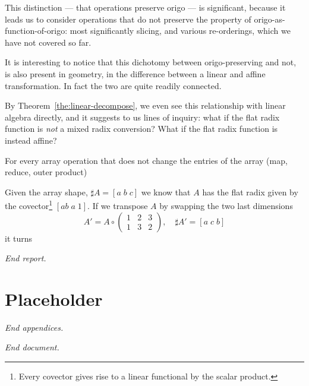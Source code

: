 \documentclass{DIKU-report-variant}
\begin{document}
This distinction --- that operations preserve origo --- is significant, because it leads us to
consider operations that do not preserve the property of origo-as-function-of-origo: most significantly
slicing, and various re-orderings, which we have not covered so far.

It is interesting to notice that this dichotomy between origo-preserving and not, is also present
in geometry, in the difference between a linear and affine transformation. In fact the two
are quite readily connected.

By Theorem~\ref{the:linear-decompose}, we even see this relationship with linear algebra directly,
and it suggests to us lines of inquiry: what if the flat radix function is \emph{not} a mixed radix
conversion? What if the flat radix function is instead affine?

For every array operation that does not change the entries of the array (map, reduce, outer product)

Given the array shape, \(\sharp A = [a\; b\; c]\) we know that \(A\) has the flat radix given
by the covector\footnote{Every covector gives rise to a linear functional by the scalar product.} \([ab\; a\; 1]\).
If we transpose \(A\) by swapping the two last dimensions
\[A' = A \circ \left(\begin{smallmatrix}1&2&3\\1&3&2\end{smallmatrix}\right),\quad \sharp A' = [a\; c\; b]\]
it turns


\vfill
\begin{center}\itshape End report.\end{center}
\clearpage

\appendix
\renewcommand\thesection{\Alph{section}}
{}

\section{Placeholder}

\vfill
\begin{center}\itshape End appendices.\end{center}
\clearpage

{}
\printbibliography

\vfill
\begin{center}\itshape End document.\end{center}
\end{document}
